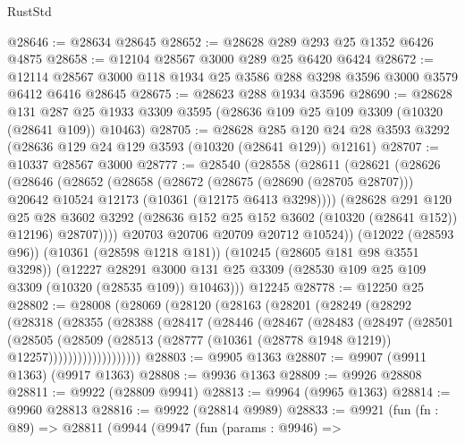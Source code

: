 \begin{lexlean}{RustStd}
\begin{coremodule}
@28646 := @28634 @28645
@28652 := @28628 @289 @293 @25 @1352 @6426 @4875
@28658 := @12104 @28567 @3000 @289 @25 @6420 @6424
@28672 := @12114 @28567 @3000 @118 @1934 @25 @3586 @288 @3298 @3596 @3000 @3579 @6412 @6416 @28645
@28675 := @28623 @288 @1934 @3596
@28690 := @28628
    @131
    @287
    @25
    @1933
    @3309
    @3595
    (@28636 @109 @25 @109 @3309 (@10320 (@28641 @109)) @10463)
@28705 := @28628
    @285
    @120
    @24
    @28
    @3593
    @3292
    (@28636 @129 @24 @129 @3593 (@10320 (@28641 @129)) @12161)
@28707 := @10337 @28567 @3000
@28777 := @28540
    (@28558
      (@28611
        (@28621
          (@28626
            (@28646
              (@28652
                (@28658
                  (@28672
                    (@28675 (@28690 (@28705 @28707)))
                    @20642
                    @10524
                    @12173
                    (@10361 (@12175 @6413 @3298))))
                (@28628
                  @291
                  @120
                  @25
                  @28
                  @3602
                  @3292
                  (@28636 @152 @25 @152 @3602 (@10320 (@28641 @152)) @12196)
                  @28707))))
          @20703
          @20706
          @20709
          @20712
          @10524))
      (@12022 (@28593 @96))
      (@10361 (@28598 @1218 @181))
      (@10245 (@28605 @181 @98 @3551 @3298))
      (@12227
        @28291
        @3000
        @131
        @25
        @3309
        (@28530 @109 @25 @109 @3309 (@10320 (@28535 @109)) @10463)))
    @12245
@28778 := @12250 @25
@28802 := @28008
    (@28069
      (@28120
        (@28163
          (@28201
            (@28249
              (@28292
                (@28318
                  (@28355
                    (@28388
                      (@28417
                        (@28446
                          (@28467
                            (@28483
                              (@28497
                                (@28501
                                  (@28505
                                    (@28509
                                      (@28513
                                        (@28777
                                          (@10361 (@28778 @1948 @1219))
                                          @12257)))))))))))))))))))
@28803 := @9905 @1363
@28807 := @9907 (@9911 @1363) (@9917 @1363)
@28808 := @9936 @1363
@28809 := @9926 @28808
@28811 := @9922 (@28809 @9941)
@28813 := @9964 (@9965 @1363)
@28814 := @9960 @28813
@28816 := @9922 (@28814 @9989)
@28833 := @9921
    (fun (fn : @89) =>
    @28811
      (@9944
        (@9947
          (fun (params : @9946) =>

\end{coremodule}
\end{lexlean}
